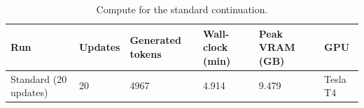 \begin{table}[t]
\centering
\small
\caption{Compute for the standard continuation.}
\begin{tabular}{llllll}
\toprule
Run & Updates & Generated tokens & Wall-clock (min) & Peak VRAM (GB) & GPU \\
\midrule
Standard (20 updates) & 20 & 4967 & 4.914 & 9.479 & Tesla T4 \\
\bottomrule
\end{tabular}
\end{table}
